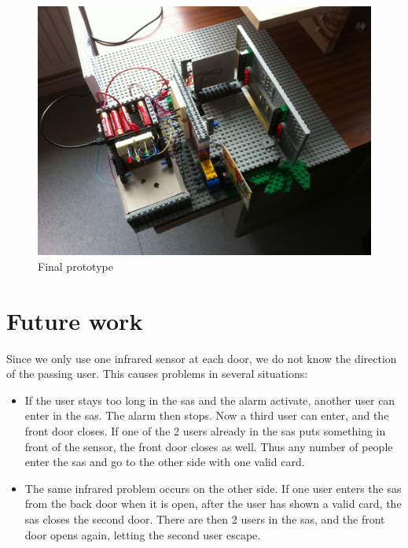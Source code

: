 
\begin{figure}[!h]
	\includegraphics[scale=0.18]{photo1}
    \caption{Final prototype}
    \label{finalPrototype}
\end{figure}

\section{Future work}
Since we only use one infrared sensor at each door, we do not know the direction of the passing user. This causes problems in several situations:

\begin{itemize}
	\item If the user stays too long in the sas and the alarm activate, another user can enter in the sas. The alarm then stops. Now a third user can enter, and the front door closes. If one of the 2 users already in the sas puts something in front of the sensor, the front door closes as well. Thus any number of people enter the sas and go to the other side with one valid card.
    
    \item The same infrared problem occurs on the other side. If one user enters the sas from the back door when it is open, after the user has shown a valid card, the sas closes the second door. There are then 2 users in the sas, and the front door opens again, letting the second user escape.
	
\end{itemize}


